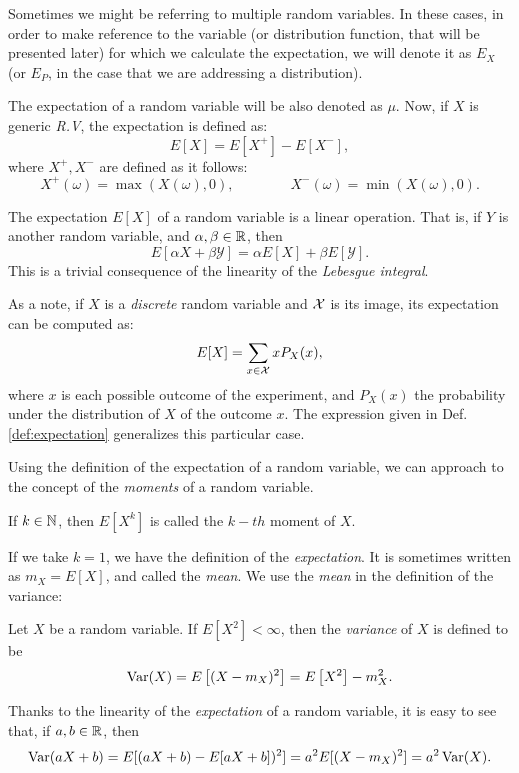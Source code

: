Sometimes we might be referring to multiple random variables. In these cases, in order to make reference to the variable (or distribution function, that will be presented later) for which we calculate the expectation, we will denote it as $E_X$ (or $E_P$, in the case that we are addressing a distribution).

The expectation of a random variable will be also denoted as $\mu$. Now, if $X$ is generic \emph{R.V}, the expectation is defined as:
$$
E[X] = E[X^+] - E[X^-],
$$
where $X^+,X^-$ are defined as it follows:
$$
X^+(\omega) = \max(X(\omega),0), \quad \quad  \quad \quad X^-(\omega) = \min(X(\omega),0).
$$

The expectation $E[X]$ of a random variable is a linear operation. That is, if $Y$ is another random variable, and $\alpha,\beta \in \mathbb{R}$, then
$$
E[\alpha X + \beta \mathcal Y] = \alpha E[X] + \beta E[\mathcal Y].
$$
This is a trivial consequence of the linearity of the \emph{Lebesgue integral}.

As a note, if $X$ is a \emph{discrete} random variable and $\mathcal{X}$ is its image, its expectation can be computed as:
$$
E[X] = \sum_{x \in \mathcal{X}} x  P_X(x),
$$
where $x$ is each possible outcome of the experiment, and $P_X(x)$ the probability under the distribution of $X$ of the outcome $x$. 
The expression given in Def. \ref{def:expectation}  generalizes this particular case.

Using the definition of the expectation of a random variable, we can approach to the concept of the \emph{moments} of a random variable.

\begin{ndef}
If $k \in \mathbb N$, then $E[X^k]$ is called the $k-th$ moment of $X$.
\end{ndef}
If we take $k = 1$, we have the definition of the \emph{expectation}. It is sometimes written as $m_X = E[X]$, and called the \emph{mean}. We use the \emph{mean} in the definition of the variance:

\begin{ndef}
Let $X$ be a random variable. If $E\left[X^2\right] < \infty$, then the \emph{variance} of $X$ is defined to be
$$
\operatorname*{Var}(X) = E\left[(X - m_X)^2\right] = E\left[X^2\right] - m_X^2.
$$
\end{ndef}

Thanks to the linearity of the \emph{expectation} of a random variable, it is easy to see that, if $a,b \in \mathbb{R}$, then
$$
\operatorname*{Var}(aX + b) = E[(aX + b) - E[aX + b])^2] = a^2E[(X - m_X)^2] = a^2 \operatorname*{Var}(X).
$$

